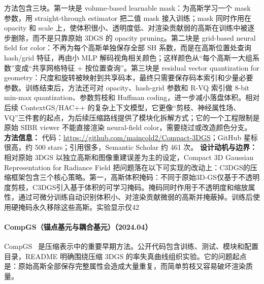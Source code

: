 方法包含三块。第一块是 volume-based learnable mask：为高斯学习一个 mask 参数，用 straight-through estimator 把二值 mask 接入训练；mask 同时作用在 opacity 和 scale 上，使体积很小、透明度低、对渲染贡献弱的高斯在训练中被逐步删除，而不是只靠原始 3DGS 的 opacity pruning。第二块是 grid-based neural field for color：不再为每个高斯单独保存全部 SH 系数，而是在高斯位置处查询 hash/grid 特征，再由小 MLP 解码视角相关颜色；这样颜色从“每个高斯一大组系数”变成“共享网格特征 + 按位置查询”。第三块是 residual vector quantization for geometry：尺度和旋转被映射到共享码本，最终只需要保存码本索引和少量必要参数。训练结束后，方法还可对 opacity、hash-grid 参数和 R-VQ 索引做 8-bit min-max quantization、参数剪枝和 Huffman coding，进一步减小落盘体积。相对后续 ContextGS/HAC++ 的复杂上下文模型，它更像“剪枝、神经属性场、VQ”三件套的起点，为后续压缩路线提供了模块化拆解方式；它的一个工程限制是原始 SIBR viewer 不能直接渲染 neural-field color，需要绕过或改造颜色分支。
\textbf{方法信息：} 代码：\url{https://github.com/maincold2/Compact-3DGS}；GitHub 星标很高，约 500 stars；引用很多，Semantic Scholar 约 461 次。
\textbf{设计动机与边界：} 相对原始 3DGS 以独立高斯和图像重建误差为主的设定，Compact 3D Gaussian Representation for Radiance Field 把问题落在以下可实现的改动上：C3DGS的压缩框架包含三个核心策略。第一，高斯体积掩码：不同于原始3D-GS仅基于不透明度剪枝，C3DGS引入基于体积的可学习掩码。掩码同时作用于不透明度和缩放属性，通过可微分训练自动识别体积小、对渲染贡献微弱的高斯并掩蔽掉。训练后使用硬掩码永久移除这些高斯。实验显示仅42%
\paragraph{CompGS（锚点基元与耦合基元）（2024.04）}
CompGS~\cite{2404_09458} 是压缩表示中的重要早期方法。公开代码包含训练、测试、模块和配置目录，README 明确围绕压缩 3DGS 的率失真曲线组织实验。它的问题起点是：原始高斯全部保存完整属性会造成大量重复，而简单剪枝又容易破坏渲染质量。

